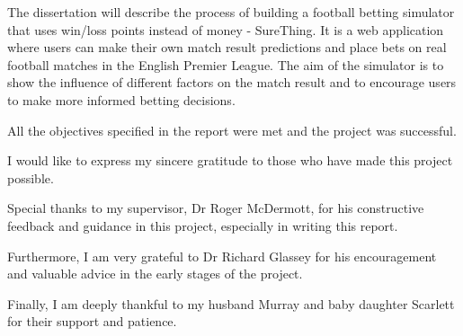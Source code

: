 \beforeabstract
{}
The dissertation will describe the process of building a football betting simulator that uses win/loss points instead of money - SureThing. It is a web application where users can make their own match result predictions and place bets on real football matches in the English Premier League. The aim of the simulator is to show the influence of different factors on the match result and to encourage users to make more informed betting decisions.

All the objectives specified in the report were met and the project was successful.

I would like to express my sincere gratitude to those who have made this project possible. 

Special thanks to my supervisor, Dr Roger McDermott, for his constructive feedback and guidance in this project, especially in writing this report. 

Furthermore, I am very grateful to Dr Richard Glassey for his encouragement and valuable advice in the early stages of the project.

Finally, I am deeply thankful to my husband Murray and baby daughter Scarlett for their support and patience.

\afterpreface
\afterabstract
